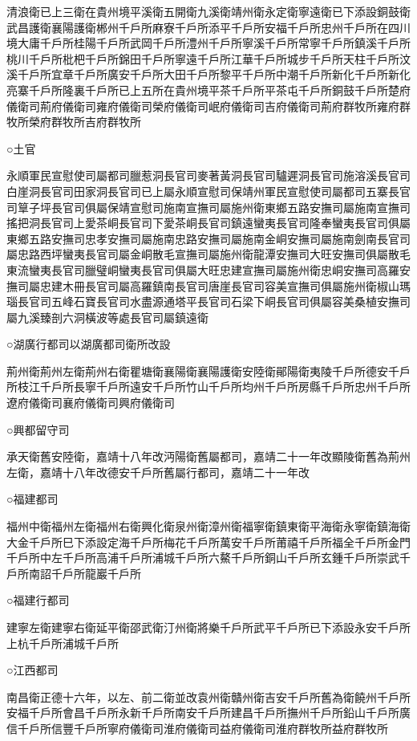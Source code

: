 清浪衛已上三衛在貴州境平溪衛五開衛九溪衛靖州衛永定衛寧遠衛已下添設銅鼓衛武昌護衛襄陽護衛郴州千戶所麻寮千戶所添平千戶所安福千戶所忠州千戶所在四川境大庸千戶所桂陽千戶所武岡千戶所澧州千戶所寧溪千戶所常寧千戶所鎮溪千戶所桃川千戶所枇杷千戶所錦田千戶所寧遠千戶所江華千戶所城步千戶所天柱千戶所汶溪千戶所宜章千戶所廣安千戶所大田千戶所黎平千戶所中潮千戶所新化千戶所新化亮寨千戶所隆裏千戶所已上五所在貴州境平茶千戶所平茶屯千戶所銅鼓千戶所楚府儀衛司荊府儀衛司雍府儀衛司榮府儀衛司岷府儀衛司吉府儀衛司荊府群牧所雍府群牧所榮府群牧所吉府群牧所

○土官

永順軍民宣慰使司屬都司臘惹洞長官司麥著黃洞長官司驢遲洞長官司施溶溪長官司白崖洞長官司田家洞長官司已上屬永順宣慰司保靖州軍民宣慰使司屬都司五寨長官司筸子坪長官司俱屬保靖宣慰司施南宣撫司屬施州衛東鄉五路安撫司屬施南宣撫司搖把洞長官司上愛茶峒長官司下愛茶峒長官司鎮遠蠻夷長官司隆奉蠻夷長官司俱屬東鄉五路安撫司忠孝安撫司屬施南忠路安撫司屬施南金峒安撫司屬施南劍南長官司屬忠路西坪蠻夷長官司屬金峒散毛宣撫司屬施州衛龍潭安撫司大旺安撫司俱屬散毛東流蠻夷長官司臘璧峒蠻夷長官司俱屬大旺忠建宣撫司屬施州衛忠峒安撫司高羅安撫司屬忠建木冊長官司屬高羅鎮南長官司唐崖長官司容美宣撫司俱屬施州衛椒山瑪瑙長官司五峰石寶長官司水盡源通塔平長官司石梁下峒長官司俱屬容美桑植安撫司屬九溪臻剖六洞橫波等處長官司屬鎮遠衛

○湖廣行都司以湖廣都司衛所改設

荊州衛荊州左衛荊州右衛瞿塘衛襄陽衛襄陽護衛安陸衛鄖陽衛夷陵千戶所德安千戶所枝江千戶所長寧千戶所遠安千戶所竹山千戶所均州千戶所房縣千戶所忠州千戶所遼府儀衛司襄府儀衛司興府儀衛司

○興都留守司

承天衛舊安陸衛，嘉靖十八年改沔陽衛舊屬都司，嘉靖二十一年改顯陵衛舊為荊州左衛，嘉靖十八年改德安千戶所舊屬行都司，嘉靖二十一年改

○福建都司

福州中衛福州左衛福州右衛興化衛泉州衛漳州衛福寧衛鎮東衛平海衛永寧衛鎮海衛大金千戶所巳下添設定海千戶所梅花千戶所萬安千戶所莆禧千戶所福全千戶所金門千戶所中左千戶所高浦千戶所浦城千戶所六鰲千戶所銅山千戶所玄鍾千戶所崇武千戶所南詔千戶所龍巖千戶所

○福建行都司

建寧左衛建寧右衛延平衛邵武衛汀州衛將樂千戶所武平千戶所已下添設永安千戶所上杭千戶所浦城千戶所

○江西都司

南昌衛正德十六年，以左、前二衛並改袁州衛贛州衛吉安千戶所舊為衛饒州千戶所安福千戶所會昌千戶所永新千戶所南安千戶所建昌千戶所撫州千戶所鉛山千戶所廣信千戶所信豐千戶所寧府儀衛司淮府儀衛司益府儀衛司淮府群牧所益府群牧所

